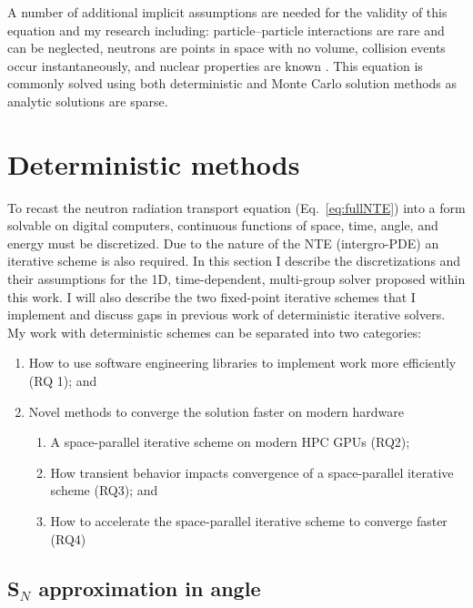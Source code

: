 A number of additional implicit assumptions are needed for the validity of this equation and my research including: particle--particle interactions are rare and can be neglected, neutrons are points in space with no volume, collision events occur instantaneously, and nuclear properties are known \cite{lewis_computational_1984}.
This equation is commonly solved using both deterministic and Monte Carlo solution methods as analytic solutions are sparse.

\section{Deterministic methods}

To recast the neutron radiation transport equation (Eq.~\eqref{eq:fullNTE}) into a form solvable on digital computers, continuous functions of space, time, angle, and energy must be discretized.
Due to the nature of the NTE (intergro-PDE) an iterative scheme is also required.
In this section I describe the discretizations and their assumptions for the 1D, time-dependent, multi-group solver proposed within this work.
I will also describe the two fixed-point iterative schemes that I implement and discuss gaps in previous work of deterministic iterative solvers.
My work with deterministic schemes can be separated into two categories:
\begin{enumerate}
    \item How to use software engineering libraries to implement work more efficiently (RQ 1); and
    \item Novel methods to converge the solution faster on modern hardware
    \begin{enumerate}
        \item A space-parallel iterative scheme on modern HPC GPUs (RQ2);
        \item How transient behavior impacts convergence of a space-parallel iterative scheme (RQ3); and
        \item How to accelerate the space-parallel iterative scheme to converge faster (RQ4)
    \end{enumerate}
\end{enumerate}

\subsection{S$_N$ approximation in angle}

